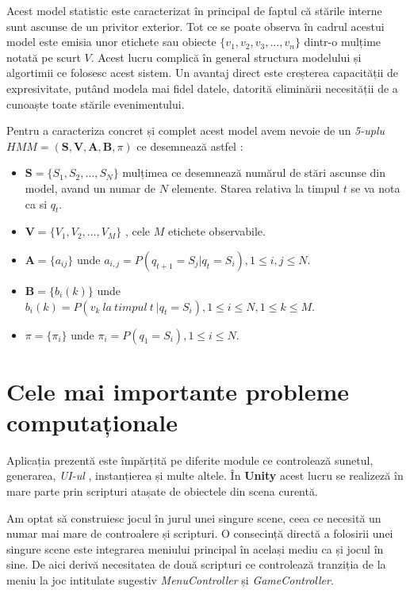 Acest model statistic este caracterizat în principal de faptul că stările interne sunt ascunse de un privitor exterior. Tot ce se poate observa în cadrul acestui model este emisia unor etichete sau obiecte 
$\{v_{1},v_{2},v_{3},\dots,v_{n}\}$ dintr-o mulțime notată pe scurt $V$. Acest lucru complică în general structura modelului și algortimii ce folosesc acest sistem. Un avantaj direct este creșterea capacității de expresivitate, putând modela mai fidel datele, datorită eliminării necesității de a cunoaște toate stările evenimentului.\par

Pentru a caracteriza concret și complet acest model avem nevoie de un \textit{5-uplu} $ HMM = (\textbf{S},\textbf{V},\textbf{A},\textbf{B},\pi)$ ce desemnează astfel : \par
\begin{itemize}
\item{$\textbf{S} = \{S_{1},S_{2},\dots,S_{N}\}$ mulțimea ce desemnează numărul de stări ascunse din model, avand un numar de $N$ elemente. Starea relativa la timpul $t$ se va nota ca si $q_{t}$.}
\item{$\textbf{V} = \{V_{1},V_{2},\dots,V_{M}\}$ , cele $M$ etichete observabile.}
\item{$\textbf{A} = \{a_{ij}\}$ unde $a_{i,j} = P(q_{t+1} = S_{j} | q_{t} = S_{i}) , 1 \leq i , j \leq N$.}
\item{$\textbf{B} = \{b_{i}(k)\}$ unde $b_{i}(k) = P(v_{k}\ la\ timpul\ t\ | q_{t} = S_{i}), 1 \leq i \leq N , 1 \leq k \leq M$.}
\item{$\pi = \{\pi_{i}\}$ unde $\pi_{i} = P(q_{1} = S_{i}) , 1 \leq i \leq N.$}
\end{itemize}

\section{Cele mai importante probleme computaționale }
Aplicația prezentă este împărțită pe diferite module ce controlează sunetul, generarea, \textit{UI-ul} , instanțierea și multe altele. În \textbf{Unity} acest lucru se realizeză în mare parte prin scripturi atașate de obiectele din scena curentă. \par
Am optat să construiesc jocul în jurul unei singure scene, ceea ce necesită un numar mai mare de controalere și scripturi. O consecință directă a folosirii unei singure scene este integrarea meniului principal în același mediu ca și jocul în sine. De aici derivă necesitatea de două scripturi ce controlează tranziția de la meniu la joc intitulate sugestiv \textit{MenuController} și \textit{GameController}.\par

